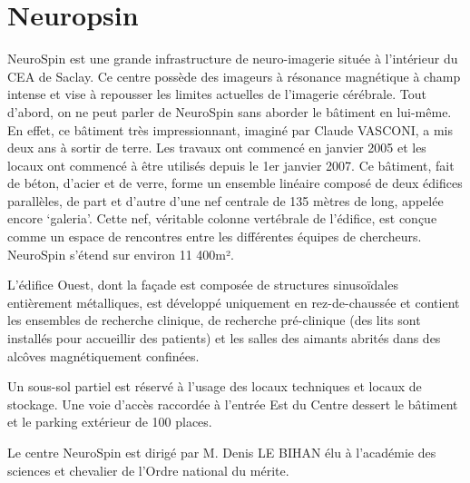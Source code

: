 \section{Neuropsin}

NeuroSpin est une grande infrastructure de neuro-imagerie située à l’intérieur du CEA de Saclay. Ce centre possède des imageurs à résonance magnétique à champ intense et vise à repousser les limites actuelles de l’imagerie cérébrale. Tout d’abord, on ne peut parler de NeuroSpin sans aborder le bâtiment en lui-même. En effet, ce bâtiment très impressionnant, imaginé par Claude VASCONI, a mis deux ans à sortir de terre. Les travaux ont commencé en janvier 2005 et les locaux ont commencé à être utilisés depuis le 1er janvier 2007. Ce bâtiment, fait de béton, d’acier et de verre, forme un ensemble linéaire composé de deux édifices parallèles, de part et d’autre d’une nef centrale de 135 mètres de long, appelée encore ‘galeria’. Cette nef, véritable colonne vertébrale de l’édifice, est conçue comme un espace de rencontres entre les différentes équipes de chercheurs. NeuroSpin s’étend sur environ 11 400m².

L’édifice Ouest, dont la façade est composée de structures sinusoïdales entièrement métalliques, est développé uniquement en rez-de-chaussée et contient les ensembles de recherche clinique, de recherche pré-clinique (des lits sont installés pour accueillir des patients) et les salles des aimants abrités dans des alcôves magnétiquement confinées.

Un sous-sol partiel est réservé à l’usage des locaux techniques et locaux de stockage.
Une voie d’accès raccordée à l’entrée Est du Centre dessert le bâtiment et le parking extérieur de 100 places.

Le centre NeuroSpin est dirigé par M. Denis LE BIHAN élu à l'académie des sciences et chevalier de l'Ordre national du mérite.

